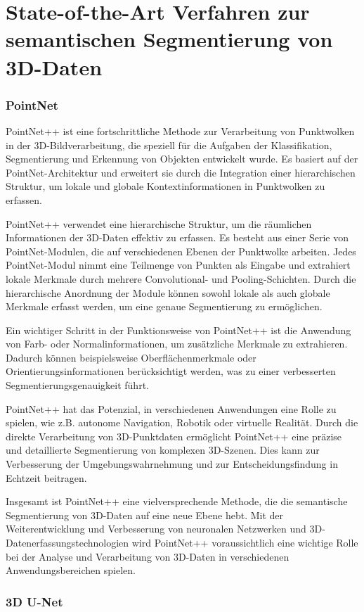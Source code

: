 \chapter{State-of-the-Art Verfahren zur semantischen Segmentierung von 3D-Daten}
\subsection{PointNet}
PointNet++ ist eine fortschrittliche Methode zur Verarbeitung von Punktwolken
in der 3D-Bildverarbeitung, die speziell für die Aufgaben der Klassifikation,
Segmentierung und Erkennung von Objekten entwickelt wurde. Es basiert auf der
PointNet-Architektur und erweitert sie durch die Integration einer
hierarchischen Struktur, um lokale und globale Kontextinformationen in
Punktwolken zu erfassen.

PointNet++ verwendet eine hierarchische Struktur, um die räumlichen
Informationen der 3D-Daten effektiv zu erfassen. Es besteht aus einer Serie von
PointNet-Modulen, die auf verschiedenen Ebenen der Punktwolke arbeiten. Jedes
PointNet-Modul nimmt eine Teilmenge von Punkten als Eingabe und extrahiert
lokale Merkmale durch mehrere Convolutional- und Pooling-Schichten. Durch die
hierarchische Anordnung der Module können sowohl lokale als auch globale
Merkmale erfasst werden, um eine genaue Segmentierung zu ermöglichen.

Ein wichtiger Schritt in der Funktionsweise von PointNet++ ist die Anwendung
von Farb- oder Normalinformationen, um zusätzliche Merkmale zu extrahieren.
Dadurch können beispielsweise Oberflächenmerkmale oder
Orientierungsinformationen berücksichtigt werden, was zu einer verbesserten
Segmentierungsgenauigkeit führt.

PointNet++ hat das Potenzial, in verschiedenen Anwendungen eine Rolle zu
spielen, wie z.B. autonome Navigation, Robotik oder virtuelle Realität. Durch
die direkte Verarbeitung von 3D-Punktdaten ermöglicht PointNet++ eine präzise
und detaillierte Segmentierung von komplexen 3D-Szenen. Dies kann zur
Verbesserung der Umgebungswahrnehmung und zur Entscheidungsfindung in Echtzeit
beitragen.

Insgesamt ist PointNet++ eine vielversprechende Methode, die die semantische
Segmentierung von 3D-Daten auf eine neue Ebene hebt. Mit der Weiterentwicklung
und Verbesserung von neuronalen Netzwerken und 3D-Datenerfassungstechnologien
wird PointNet++ voraussichtlich eine wichtige Rolle bei der Analyse und
Verarbeitung von 3D-Daten in verschiedenen Anwendungsbereichen spielen.
\subsection{3D U-Net}

